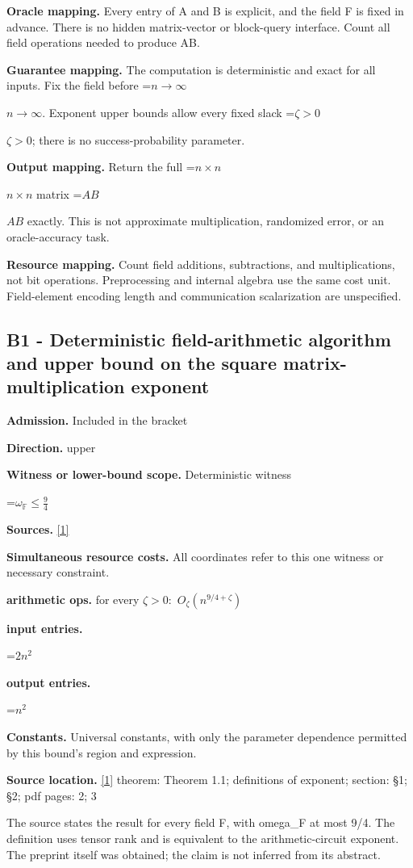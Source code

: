 \documentclass[10pt,a4paper]{article}
\newcommand{\AtlasMath}[1]{\par\begingroup\centering\setbox0=\hbox{$\displaystyle #1$}\ifdim\wd0>1.4\linewidth\typeout{ATLAS WIDE FORMULA: \the\wd0}\fi\ifdim\wd0>\linewidth\resizebox{\linewidth}{!}{\box0}\else\box0\fi\par\endgroup}
\newcommand{\AtlasInlineMath}[1]{\begingroup\setbox0=\hbox{$#1$}\ifdim\wd0>.4\linewidth\endgroup\AtlasMath{#1}\else\endgroup$#1$\fi}
\begin{document}
\textbf{Oracle mapping.} Every entry of A and B is explicit, and the field F is fixed in advance. There is no hidden matrix-vector or block-query interface. Count all field operations needed to produce AB.

\textbf{Guarantee mapping.} The computation is deterministic and exact for all inputs. Fix the field before \AtlasInlineMath{n\to\infty}. Exponent upper bounds allow every fixed slack \AtlasInlineMath{\zeta>0}; there is no success-probability parameter.

\textbf{Output mapping.} Return the full \AtlasInlineMath{n\times n} matrix \AtlasInlineMath{AB} exactly. This is not approximate multiplication, randomized error, or an oracle-accuracy task.

\textbf{Resource mapping.} Count field additions, subtractions, and multiplications, not bit operations. Preprocessing and internal algebra use the same cost unit. Field-element encoding length and communication scalarization are unspecified.

\subsection{B1 - Deterministic field-arithmetic algorithm and upper bound on the square matrix-multiplication exponent}
\textbf{Admission.} Included in the bracket

\textbf{Direction.} upper

\textbf{Witness or lower-bound scope.} Deterministic witness

\AtlasMath{\omega_{\mathbb{F}}\le\frac{9}{4}}
\textbf{Sources.} \href{https://arxiv.org/pdf/2610.30054v1}{[1]}

\textbf{Simultaneous resource costs.} All coordinates refer to this one witness or necessary constraint.

\textbf{arithmetic ops.} for every $\zeta >0:$ $O_\zeta (n^{9/4+\zeta })$

\textbf{input entries.}

\AtlasMath{2n^2}
\textbf{output entries.}

\AtlasMath{n^2}
\textbf{Constants.} Universal constants, with only the parameter dependence permitted by this bound’s region and expression.

\textbf{Source location.} \href{https://arxiv.org/pdf/2610.30054v1}{[1]} theorem: Theorem 1.1; definitions of exponent; section: §1; §2; pdf pages: 2; 3

The source states the result for every field F, with omega\_F at most 9/4. The definition uses tensor rank and is equivalent to the arithmetic-circuit exponent. The preprint itself was obtained; the claim is not inferred from its abstract.
\end{document}
